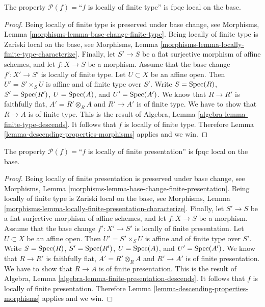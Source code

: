 \begin{lemma}
\label{lemma-descending-property-locally-finite-type}
The property $\mathcal{P}(f) =$``$f$ is locally of finite type''
is fpqc local on the base.
\end{lemma}

\begin{proof}
Being locally of finite type is preserved under base change, see
Morphisms, Lemma \ref{morphisms-lemma-base-change-finite-type}.
Being locally of finite type is Zariski local on the base, see
Morphisms, Lemma \ref{morphisms-lemma-locally-finite-type-characterize}.
Finally, let
$S' \to S$ be a flat surjective morphism of affine schemes,
and let $f : X \to S$ be a morphism. Assume that the base change
$f' : X' \to S'$ is locally of finite type.
Let $U \subset X$ be an affine open. Then $U' = S' \times_S U$
is affine and of finite type over $S'$. Write
$S = \mathop{\mathrm{Spec}}(R)$,
$S' = \mathop{\mathrm{Spec}}(R')$,
$U = \mathop{\mathrm{Spec}}(A)$, and
$U' = \mathop{\mathrm{Spec}}(A')$.
We know that $R \to R'$ is faithfully flat,
$A' = R' \otimes_R A$ and $R' \to A'$ is of finite type.
We have to show that $R \to A$ is of finite type.
This is the result of
Algebra, Lemma \ref{algebra-lemma-finite-type-descends}.
It follows that $f$ is locally of finite type.
Therefore Lemma \ref{lemma-descending-properties-morphisms} applies and we win.
\end{proof}

\begin{lemma}
\label{lemma-descending-property-locally-finite-presentation}
The property $\mathcal{P}(f) =$``$f$ is locally of finite presentation''
is fpqc local on the base.
\end{lemma}

\begin{proof}
Being locally of finite presentation is preserved under base change, see
Morphisms, Lemma \ref{morphisms-lemma-base-change-finite-presentation}.
Being locally of finite type is Zariski local on the base, see Morphisms,
Lemma \ref{morphisms-lemma-locally-finite-presentation-characterize}.
Finally, let
$S' \to S$ be a flat surjective morphism of affine schemes,
and let $f : X \to S$ be a morphism. Assume that the base change
$f' : X' \to S'$ is locally of finite presentation.
Let $U \subset X$ be an affine open. Then $U' = S' \times_S U$
is affine and of finite type over $S'$. Write
$S = \mathop{\mathrm{Spec}}(R)$,
$S' = \mathop{\mathrm{Spec}}(R')$,
$U = \mathop{\mathrm{Spec}}(A)$, and
$U' = \mathop{\mathrm{Spec}}(A')$.
We know that $R \to R'$ is faithfully flat,
$A' = R' \otimes_R A$ and $R' \to A'$ is of finite presentation.
We have to show that $R \to A$ is of finite presentation.
This is the result of
Algebra, Lemma \ref{algebra-lemma-finite-presentation-descends}.
It follows that $f$ is locally of finite presentation.
Therefore Lemma \ref{lemma-descending-properties-morphisms} applies and we win.
\end{proof}

